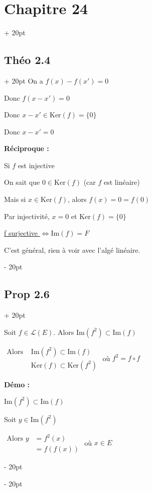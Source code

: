 \documentclass[12pt]{article}
\newcommand{\ind}[1][20pt]{\advance\leftskip + #1}
\newcommand{\deind}[1][20pt]{\advance\leftskip - #1}
\newenvironment{indt}[2][20pt]{#2 \par \ind[#1]}{\par \deind}
\begin{document}
\begin{indt}{\section*{Chapitre 24}}
\begin{indt}{\subsection*{Théo 2.4}}
      On a $f(x)-f(x')=0$

      Donc $f(x-x')=0$

      Donc $x-x'\in\mathrm{Ker}(f)=\{0\}$

      Donc $x-x'=0$

      \vspace{10pt}

      \textbf{Réciproque :}

      \vspace{10pt}

      Si $f$ est injective

      On sait que $0\in\mathrm{Ker}(f)$ (car $f$ est linéaire)

      Mais si $x\in\mathrm{Ker}(f)$, alors $f(x)=0=f(0)$

      Par injectivité, $x=0$ et $\mathrm{Ker}(f)=\{0\}$

      \vspace{10pt}

      \underline{f surjective $\Longleftrightarrow\mathrm{Im}(f)=F$}

      C'est général, rien à voir avec l'algé linéaire.

    \end{indt}

    \newpage

    \begin{indt}{\subsection*{Prop 2.6}}

      Soit $f\in\mathcal{L}(E)$. Alors $\mathrm{Im} (f^2)\subset\mathrm{Im} (f)$
      
      $\begin{array}{ll}
        \text{Alors } & \mathrm{Im}(f^2)\subset\mathrm{Im}(f)
        \\
        & \mathrm{Ker}(f)\subset\mathrm{Ker}(f^2)
      \end{array}$ 
      où $f^2=f\circ f$

      \vspace{10pt}

      \textbf{Démo :}

      \vspace{10pt}

      \underline{$\mathrm{Im}(f^2)\subset\mathrm{Im}(f)$}

      Soit $y\in\mathrm{Im}(f^2)$
        
      $\begin{array}{ll}
      \text{Alors }y & =f^2(x)
      \\
      & =f(f(x))
      \end{array}$
      où $x\in E$


\end{indt}
\end{indt}
\end{document}
